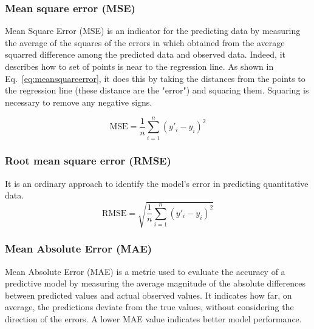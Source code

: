 \documentclass[review,12pt]{elsarticle}
\begin{document}
\subsubsection{Mean square error (MSE)}
Mean Square Error (MSE) is an indicator for the predicting data by measuring the average of the squares of the errors in which obtained from the average squarred difference among the predicted data and observed data. Indeed, it describes how to set of points is near to the regression line. As shown in Eq.~\eqref{eq:meansquareerror}, it does this by taking the distances from the points to the regression line (these distance are the "error") and squaring them. Squaring is necessary to remove any negative signs.

\begin{equation}
\mathrm{MSE} = \frac{1}{n} \sum_{i=1}^{n} \left( y'_i - y_i \right)^2
\tag{15}
\label{eq:meansquareerror}
\end{equation}

\subsubsection{Root mean square error (RMSE)}
It is an ordinary approach to identify the model's error in predicting quantitative data.
\begin{equation}
\mathrm{RMSE} = \sqrt{ \frac{1}{n} \sum_{i=1}^{n} \left( y'_i - y_i \right)^2 }
\tag{16}
\label{eq:rootmeanse}
\end{equation}

\subsubsection{Mean Absolute Error (MAE)}
Mean Absolute Error (MAE) is a metric used to evaluate the accuracy of a predictive model by measuring the average magnitude of the absolute differences between predicted values and actual observed values. It indicates how far, on average, the predictions deviate from the true values, without considering the direction of the errors. A lower MAE value indicates better model performance.

\end{document}
